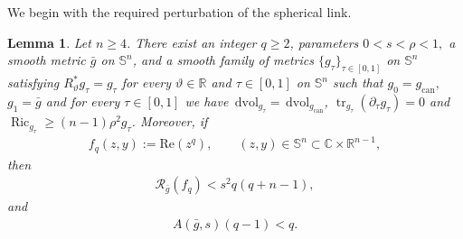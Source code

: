 \documentclass[11pt,reqno]{amsart}
\numberwithin{equation}{section}
\newtheorem{lem}[thm]{Lemma}
\theoremstyle{definition}
\theoremstyle{remark}
\def\cR {\mathcal{R}}
\newcommand{\ta}{\tau}
\renewcommand\Re{\mathrm{Re}\,}
\renewcommand{\Re}{\mathrm{Re}}
\newcommand{\0}{\emptyset}
\newcommand{\bbC}{\mathbb C}
\newcommand{\bbR}{\mathbb R}
\newcommand{\bbS}{\mathbb S}
\newcommand{\Ric}{\operatorname{Ric}}
\newcommand{\can}{\mathrm{can}}
\newcommand{\dvol}{\,\mathrm{dvol}}
\begin{document}
We begin with the required perturbation of the spherical link.
\begin{lem}\label{lem:gaussian-split-link}
Let $n\geq4$. There exist an integer $q\geq2$, parameters $0<s<\rho<1,$ a smooth metric $\bar g$ on $\bbS^n$, and a smooth family of metrics
$\{g_\ta\}_{\ta\in[0,1]}$ on $\bbS^n$ satisfying $R_\vartheta^*g_\ta=g_\ta$ for every $\vartheta\in\bbR$ and $\ta\in[0,1]$ on $\bbS^n$ such that ${g}_0=g_{\can},$ ${g}_1=\bar{g}$ and for every $\ta\in [0,1]$ we have $\dvol_{{g}_\ta}=\dvol_{g_\can}$, $\operatorname{tr}_{g_\ta}(\partial_\ta g_\ta)=0$ and $\Ric_{{g}_\ta}\geq(n-1)\rho^2{g}_\ta$. Moreover, if
\begin{align}
        f_q(z,y):=\Re(z^q),
        \qquad
        (z,y)\in\bbS^n\subset\bbC\times\bbR^{n-1},
\end{align}
then
\begin{align}\label{eq:gaussian-split-link-Rayleigh}
                \cR_{\bar g}(f_q)<s^2q(q+n-1),
\end{align}
and
\begin{align}\label{eq:gaussian-split-link-comparison}
        A(\bar{g},s)(q-1)<q.
\end{align}
\end{lem}
\end{document}
